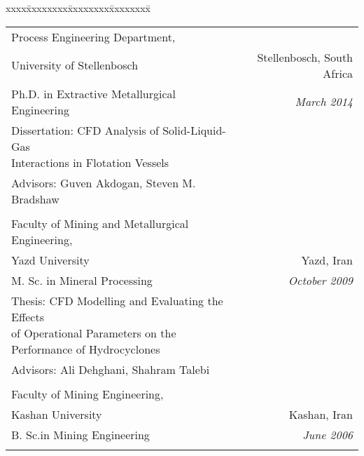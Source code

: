 \documentclass[10pt,a4]{article}
\newcommand{\quotes}[1]{``#1''}
\begin{document}
\begin{small}
\begin{tabbing}
xxxx\=xxxxxxxx\=xxxxxxxx\=xxxxxxxx\=\kill

\>\begin{tabular*}{0.97\linewidth}{l@{\extracolsep{\fill}}r}


Process Engineering Department, \\
University of Stellenbosch & Stellenbosch, South Africa\\
Ph.D. in  Extractive Metallurgical Engineering & 
{\it March 2014}\\
Dissertation: \quotes{CFD Analysis of Solid-Liquid-Gas \\Interactions in Flotation Vessels}\\
Advisors: Guven Akdogan, Steven M. Bradshaw \\
 & \\

Faculty of Mining and Metallurgical Engineering, \\
Yazd University & Yazd, Iran \\
M. Sc. in Mineral Processing &
{\it October 2009} \\
Thesis: \quotes{CFD Modelling and Evaluating the Effects \\of Operational Parameters
on the Performance of Hydrocyclones}\\
Advisors: Ali Dehghani, Shahram Talebi \\
 & \\

Faculty of Mining Engineering, \\
Kashan University & Kashan, Iran \\
B. Sc.in Mining Engineering &
{\it June 2006}\\
 & \\

\end{tabular*}
\end{tabbing}

%
%


\end{small}
\end{document}
